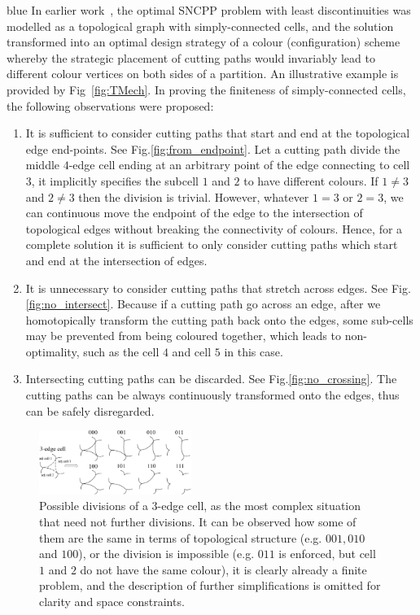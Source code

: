 \documentclass[Afour,sageh,times]{sagej}
\begin{document}
\begin{color}{blue}
In earlier work~\cite{Yang2020Cellular}, the optimal SNCPP problem with least discontinuities was modelled as a 
topological graph with simply-connected cells, and the solution transformed into an optimal design strategy of a colour (configuration) scheme whereby the strategic placement of cutting paths would invariably 
lead to different colour vertices on both sides of a partition. An illustrative example is provided by Fig~\ref{fig:TMech}. 
In proving the finiteness of simply-connected cells, the following observations were proposed:
\begin{enumerate}
\item It is sufficient to consider cutting paths that start and end at the topological edge end-points. See Fig.\ref{fig:from_endpoint}. Let a cutting path divide the middle $4$-edge cell ending at an arbitrary point of the edge connecting to cell $3$, it implicitly specifies the subcell $1$ and $2$ to have different colours. If $1\neq 3$ and $2\neq 3$ then the division is trivial. However, whatever $1 = 3$ or $2 = 3$, we can continuous move the endpoint of the edge to the intersection of topological edges without breaking the connectivity of colours. Hence, for a complete solution it is sufficient to only consider cutting paths which start and end at the intersection of edges.
\item It is unnecessary to consider cutting paths that stretch across edges. See Fig.\ref{fig:no_intersect}. Because if a cutting path go across an edge, after we homotopically transform the cutting path back onto the edges, some sub-cells may be prevented from being coloured together, which leads to non-optimality, such as the cell $4$ and cell $5$ in this case. 
\item Intersecting cutting paths can be discarded. See Fig.\ref{fig:no_crossing}. The cutting paths can be always continuously transformed onto the edges, thus can be safely disregarded. 
\end{enumerate}

\begin{figure}[t]
\centering
\includegraphics[width = 0.44\textwidth]{figures/TMech_simply_connected_example/cell3}
\caption{Possible divisions of a $3$-edge cell, as the most complex situation that need not further divisions. It can be observed how some of them are the same in terms of topological structure (e.g. $001, 010$ and $100$), or the division is impossible (e.g. $011$ is enforced, but cell $1$ and $2$ do not have the same colour), it is clearly already a finite problem, and the description of further simplifications is omitted for clarity and space constraints. }\label{fig:3cell}
\end{figure}


\end{color}
\end{document}
